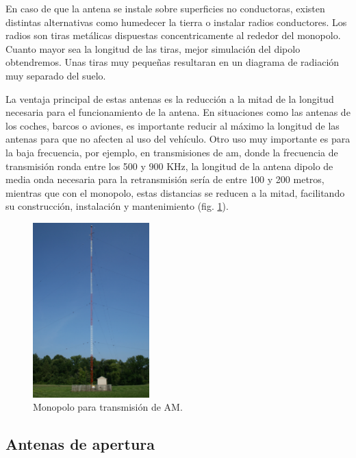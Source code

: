 \par En caso de que la antena se instale sobre superficies no conductoras, existen distintas alternativas como humedecer la tierra o instalar radios conductores. Los radios son tiras metálicas dispuestas concentricamente al rededor del monopolo. Cuanto mayor sea la longitud de las tiras, mejor simulación del dipolo obtendremos. Unas tiras muy pequeñas resultaran en un diagrama de radiación muy separado del suelo.
\\
\par La ventaja principal de estas antenas es la reducción a la mitad de la longitud necesaria para el funcionamiento de la antena. En situaciones como las antenas de los coches, barcos o aviones, es importante reducir al máximo la longitud de las antenas para que no afecten al uso del vehículo. Otro uso muy importante es para la baja frecuencia, por ejemplo, en transmisiones de \gls{am}, donde la frecuencia de transmisión ronda entre los 500 y 900 KHz, la longitud de la antena dipolo de media onda necesaria para la retransmisión sería de entre 100 y 200 metros, mientras que con el monopolo, estas distancias se reducen a la mitad, facilitando su construcción, instalación y mantenimiento (fig. \ref{fig:monopoloam}).

\begin{figure}[h]
    \centering
        \includegraphics[width=0.4\textwidth]{archivos/monopolo/monopolo}
        \caption{Monopolo para transmisión de AM. \citep{Sagdejev2008}}
        \label{fig:monopoloam}
\end{figure}

\subsection{Antenas de apertura}
